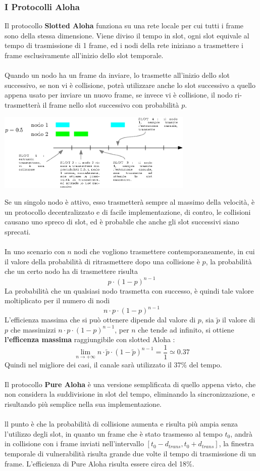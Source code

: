 \documentclass[12pt, letterpaper]{article}
\newcommand{\acc}{\\\hphantom{}\\}
\begin{document}
\subsubsection{I Protocolli Aloha}
Il protocollo \textbf{Slotted Aloha} funziona su una rete locale per cui tutti i frame sono della stessa dimensione. Viene 
diviso il tempo in slot, ogni slot equivale al tempo di trasmissione di 1 frame, ed i nodi della rete iniziano a trasmettere 
i frame esclusivamente all'inizio dello slot temporale.\acc 
Quando un nodo ha un frame da inviare, lo trasmette all'inizio dello slot successivo, se non vi è collisione, 
potrà utilizzare anche lo slot successivo a quello appena usato per inviare un nuovo frame, se invece vi è 
collisione, il nodo ri-trasmetterà il frame nello slot successivo con probabilità $p$.\begin{center}
    \includegraphics[width=0.7\textwidth ]{images/slottedAloha.eps}
\end{center} 
Se un singolo nodo è attivo, esso trasmetterà sempre al massimo della velocità, è un protocollo decentralizzato 
e di facile implementazione, di contro, le collisioni causano uno spreco di slot, ed è probabile che anche gli slot 
successivi siano sprecati.\acc 
In uno scenario con $n$ nodi che vogliono trasmettere contemporaneamente, in cui il valore della probabilità 
di ritrasmettere dopo una collisione è $p$, la probabilità che un certo nodo ha di trasmettere risulta 
$$ p\cdot (1-p)^{n-1} $$
La probabilità che un qualsiasi nodo trasmetta con successo, è quindi tale valore moltiplicato per il numero di nodi 
$$ n\cdot p\cdot (1-p)^{n-1}  $$
L'efficienza massima che si può ottenere dipende dal valore di $p$, sia $\tilde p$ il valore di $p$ che 
massimizzi $ n\cdot p\cdot (1-p)^{n-1} $, per $n$ che tende ad infinito, si ottiene \textbf{l'efficenza massima} 
raggiungibile con slotted Aloha : $$\lim_{n\rightarrow +\infty}  n\cdot\tilde p\cdot (1-\tilde p)^{n-1} = \dfrac{1}{1}\simeq 0.37 $$
Quindi nel migliore dei casi, il canale sarà utilizzato il 37\% del tempo.\acc 
Il protocollo \textbf{Pure Aloha} è una versione semplificata di quello appena visto, che non considera la suddivisione 
in slot del tempo, eliminando la sincronizzazione, e risultando più semplice nella sua implementazione. \acc ll punto è che la probabilità di collisione 
aumenta e risulta più ampia senza l'utilizzo degli slot, in quanto un frame che è stato trasmesso al tempo $t_0$, andrà in 
collisione con i frame inviati nell'intervallo $[t_0-d_{trans},t_0+d_{trans}]$, la finestra temporale di vulnerabilità risulta 
grande due volte il tempo di trasmissione di un frame. L'efficienza di Pure Aloha risulta essere circa del 18\%.
\end{document}
